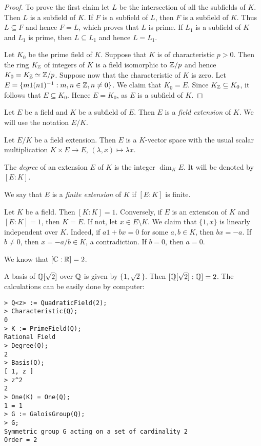 \begin{proof}
	To prove the first claim let $L$ be the intersection
	of all the subfields of $K$. Then $L$ is a subfield of $K$. 
	If $F$ is a subfield of $L$, then $F$ is a subfield
	of $K$. Thus $L\subseteq F$ and hence $F=L$, which proves
	that $L$ is prime. If $L_1$ is a subfield of $K$
	and $L_1$ is prime, then $L\subseteq L_1$ and 
	hence $L=L_1$. 

	Let $K_0$ be the prime field of $K$. Suppose that $K$ is of characteristic
	$p>0$. Then the ring $K_{\mathbb{Z}}$ of integers of $K$ 
	is a field isomorphic to $\mathbb{Z}/p$ and hence $K_0=
	K_{\mathbb{Z}}\simeq \mathbb{Z}/p$. Suppose now that the characteristic of $K$ is zero. Let
	$E=\{m1(n1)^{-1}:m,n\in\mathbb{Z},n\ne 0\}$. We claim that $K_0=E$. Since $K_{\mathbb{Z}}\subseteq
	K_0$, it follows that $E\subseteq K_0$. Hence $E=K_0$, as $E$ is a subfield
	of $K$.  
\end{proof}

\begin{definition}
	Let $E$ be a field and $K$ be a subfield of $E$. Then 
	$E$ is a \emph{field extension} of $K$. We will use
	the notation $E/K$. 
\end{definition}

Let $E/K$ be a field extension. Then $E$ 
is a $K$-vector space with the usual scalar multiplication
$K\times E\to E$, 
$(\lambda, x)\mapsto \lambda x$.

\begin{definition}
	The \emph{degree} of an extension $E$ of $K$ 
	is the integer $\dim_KE$. It will be denoted by $[E:K]$. 
\end{definition}

We say that $E$ is a \emph{finite extension} of $K$ 
if $[E:K]$ is finite. 

\begin{example}
	Let $K$ be a field. Then $[K:K]=1$. Conversely, 
	if $E$ is an extension of $K$ and $[E:K]=1$, then $K=E$. 
	If not, let $x\in E\setminus K$. We claim that
	$\{1,x\}$ is linearly independent over $K$. Indeed, 
	if $a1+bx=0$ for some $a,b\in K$, then $bx=-a$. If 
	$b\ne 0$, then $x=-a/b\in K$, a contradiction. If $b=0$, then 
	$a=0$. 
\end{example}

We know that $[\mathbb{C}:\mathbb{R}]=2$. 

\begin{example}
	A basis of $\mathbb{Q}[\sqrt{2}]$ over $\mathbb{Q}$ 
	is given by $\{1,\sqrt{2}\}$. Then 
	$[\mathbb{Q}[\sqrt{2}]:\mathbb{Q}]=2$. The calculations 
	can be easily done by computer: 
\begin{lstlisting}
> Q<z> := QuadraticField(2);
> Characteristic(Q);
0
> K := PrimeField(Q);
Rational Field
> Degree(Q);
2
> Basis(Q);
[ 1, z ]
> z^2
2
> One(K) = One(Q);
1 = 1
> G := GaloisGroup(Q);
> G;
Symmetric group G acting on a set of cardinality 2
Order = 2
\end{lstlisting}
\end{example}

